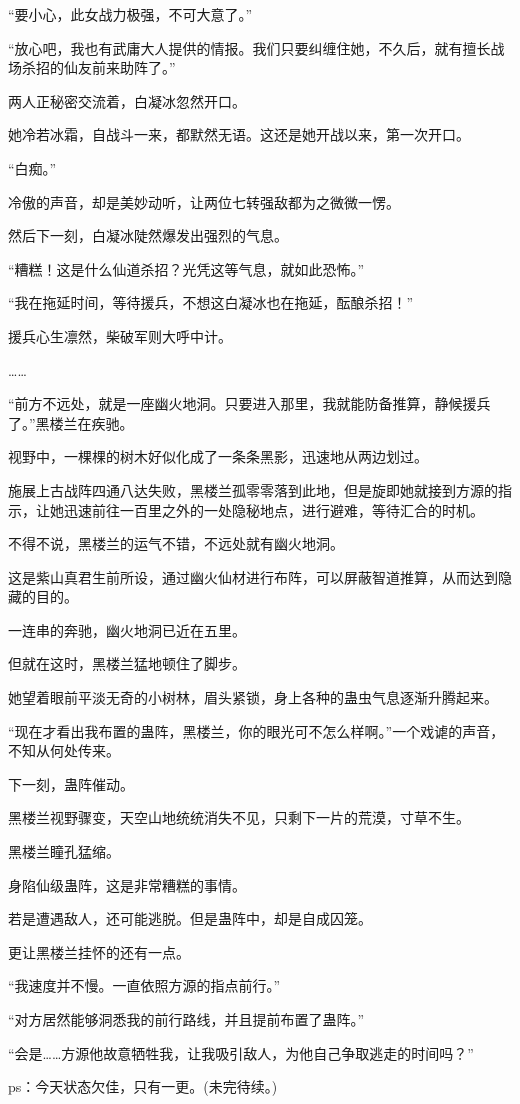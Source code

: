 \begin{this_body}
“要小心，此女战力极强，不可大意了。”

“放心吧，我也有武庸大人提供的情报。我们只要纠缠住她，不久后，就有擅长战场杀招的仙友前来助阵了。”

两人正秘密交流着，白凝冰忽然开口。

她冷若冰霜，自战斗一来，都默然无语。这还是她开战以来，第一次开口。

“白痴。”

冷傲的声音，却是美妙动听，让两位七转强敌都为之微微一愣。

然后下一刻，白凝冰陡然爆发出强烈的气息。

“糟糕！这是什么仙道杀招？光凭这等气息，就如此恐怖。”

“我在拖延时间，等待援兵，不想这白凝冰也在拖延，酝酿杀招！”

援兵心生凛然，柴破军则大呼中计。

……

“前方不远处，就是一座幽火地洞。只要进入那里，我就能防备推算，静候援兵了。”黑楼兰在疾驰。

视野中，一棵棵的树木好似化成了一条条黑影，迅速地从两边划过。

施展上古战阵四通八达失败，黑楼兰孤零零落到此地，但是旋即她就接到方源的指示，让她迅速前往一百里之外的一处隐秘地点，进行避难，等待汇合的时机。

不得不说，黑楼兰的运气不错，不远处就有幽火地洞。

这是紫山真君生前所设，通过幽火仙材进行布阵，可以屏蔽智道推算，从而达到隐藏的目的。

一连串的奔驰，幽火地洞已近在五里。

但就在这时，黑楼兰猛地顿住了脚步。

她望着眼前平淡无奇的小树林，眉头紧锁，身上各种的蛊虫气息逐渐升腾起来。

“现在才看出我布置的蛊阵，黑楼兰，你的眼光可不怎么样啊。”一个戏谑的声音，不知从何处传来。

下一刻，蛊阵催动。

黑楼兰视野骤变，天空山地统统消失不见，只剩下一片的荒漠，寸草不生。

黑楼兰瞳孔猛缩。

身陷仙级蛊阵，这是非常糟糕的事情。

若是遭遇敌人，还可能逃脱。但是蛊阵中，却是自成囚笼。

更让黑楼兰挂怀的还有一点。

“我速度并不慢。一直依照方源的指点前行。”

“对方居然能够洞悉我的前行路线，并且提前布置了蛊阵。”

“会是……方源他故意牺牲我，让我吸引敌人，为他自己争取逃走的时间吗？”

ps：今天状态欠佳，只有一更。(未完待续。)

\end{this_body}

